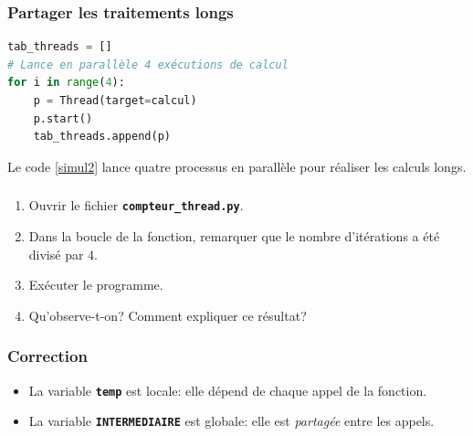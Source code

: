 \documentclass[svgnames,11pt]{beamer}
\begin{document}
\begin{frame}[fragile]
    \frametitle{Partager les traitements longs}

    \begin{center}
        \begin{lstlisting}[language=Python , basicstyle=\ttfamily\small, xleftmargin=2em, xrightmargin=2em]
tab_threads = []
# Lance en parallèle 4 exécutions de calcul
for i in range(4):  
    p = Thread(target=calcul)
    p.start() 
    tab_threads.append(p)
\end{lstlisting}
        \label{simul2}
    \end{center}
    Le code \ref{simul2} lance quatre processus en parallèle pour réaliser les calculs longs.

\end{frame}
\begin{frame}
    \frametitle{}

    \begin{activite}
        \begin{enumerate}
            \item Ouvrir le fichier \textbf{\texttt{compteur\_thread.py}}.
            \item Dans la boucle de la fonction, remarquer que le nombre d'itérations a été divisé par 4.
            \item Exécuter le programme.
            \item Qu'observe-t-on? Comment expliquer ce résultat?
        \end{enumerate}
    \end{activite}

\end{frame}
\begin{frame}
    \frametitle{Correction}

    \begin{itemize}
        \item La variable \textbf{\texttt{temp}} est locale: elle dépend de chaque appel de la fonction.
        \item La variable \textbf{\texttt{INTERMEDIAIRE}} est globale: elle est \emph{partagée} entre les appels.
    \end{itemize}

\end{frame}
\end{document}
